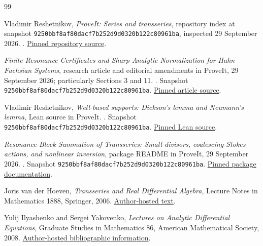 \documentclass[11pt,a4paper]{article}
\numberwithin{equation}{section}
\theoremstyle{definition}
\theoremstyle{remark}
\newcommand{\snap}{\texttt{9250bbf8af80dacf7b252d9d0320b122c80961ba}}
\begin{document}
\clearpage
\begin{thebibliography}{99}

Vladimir Reshetnikov, \emph{ProveIt: Series and transseries}, repository
index at snapshot \snap, inspected 29 September 2026.
.
\href{https://github.com/VladimirReshetnikov/ProveIt/blob/9250bbf8af80dacf7b252d9d0320b122c80961ba/Analysis/Transseries/docs/series-and-transseries/README.md}{Pinned repository source}.

\emph{Finite Resonance Certificates and Sharp Analytic Normalization for
Hahn--Fuchsian Systems}, research article and editorial amendments in
ProveIt, 29 September 2026; particularly Sections 3 and 11.
.
Snapshot \snap.
\href{https://github.com/VladimirReshetnikov/ProveIt/blob/9250bbf8af80dacf7b252d9d0320b122c80961ba/Analysis/Transseries/docs/series-and-transseries/Hahn_Fuchsian_Resonance_Analytic_Normalization/hahn_fuchsian.tex}{Pinned article source}.

Vladimir Reshetnikov, \emph{Well-based supports: Dickson's lemma and
Neumann's lemma}, Lean source in ProveIt.
.
Snapshot \snap.
\href{https://github.com/VladimirReshetnikov/ProveIt/blob/9250bbf8af80dacf7b252d9d0320b122c80961ba/Analysis/Transseries/Lean/Transseries/TransseriesWellBased.lean}{Pinned Lean source}.

\emph{Resonance-Block Summation of Transseries: Small divisors, coalescing
Stokes actions, and nonlinear inversion}, package README in ProveIt,
29 September 2026.
.
Snapshot \snap.
\href{https://github.com/VladimirReshetnikov/ProveIt/blob/9250bbf8af80dacf7b252d9d0320b122c80961ba/Analysis/Transseries/docs/series-and-transseries/Resonance_Block_Summation_Transseries/README.md}{Pinned package documentation}.

Joris van der Hoeven, \emph{Transseries and Real Differential Algebra},
Lecture Notes in Mathematics 1888, Springer, 2006.
\href{https://www.texmacs.org/joris/ln/ln.html}{Author-hosted text}.

Yulij Ilyashenko and Sergei Yakovenko,
\emph{Lectures on Analytic Differential Equations}, Graduate Studies in
Mathematics 86, American Mathematical Society, 2008.
\href{https://www.wisdom.weizmann.ac.il/~yakov/book-titlepage.htm}{Author-hosted bibliographic information}.


\end{thebibliography}
\end{document}
